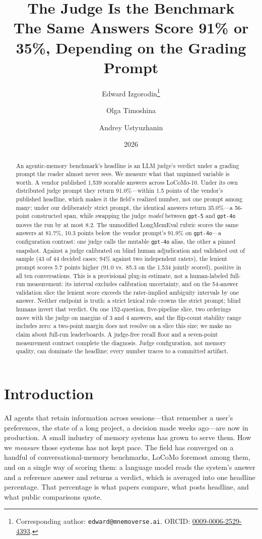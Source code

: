 \documentclass[11pt]{article}
\title{\textbf{The Judge Is the Benchmark}\\[2pt]
\large The Same Answers Score 91\% or 35\%, Depending on the Grading Prompt}
\author[1,2]{Edward Izgorodin\thanks{Corresponding author: \texttt{edward@mnemoverse.ai}.
  ORCID: \href{https://orcid.org/0009-0006-2529-4393}{0009-0006-2529-4393}.}}
\author[1]{Olga Timoshina}
\author[2,3,4]{Andrey Ustyuzhanin}
\affil[1]{Mnemoverse.AI,\ Funchal, Madeira, Portugal\thanks{\url{https://mnemoverse.com}}}
\affil[2]{Constructor Labs, Bremen, Germany}
\affil[3]{Constructor University, Bremen, Germany}
\affil[4]{Institute for Functional Intelligent Materials, National University of Singapore, Singapore}
\date{2026}
\begin{document}
\maketitle

\begin{abstract}
An agentic-memory benchmark's headline is an LLM judge's verdict under a grading prompt the reader almost never sees. We measure what that unpinned variable is worth. A vendor published 1{,}539 scorable answers across LoCoMo-10. Under its own distributed judge prompt they return 91.0\%---within 1.5 points of the vendor's published headline, which makes it the field's realized number, not one prompt among many; under our deliberately strict prompt, the identical answers return 35.0\%---a 56-point constructed span, while swapping the judge \emph{model} between \texttt{gpt-5} and \texttt{gpt-4o} moves the run by at most 8.2. The unmodified LongMemEval rubric scores the same answers at 81.7\%, 10.3 points below the vendor prompt's 91.9\% on \texttt{gpt-4o}---a configuration contrast: one judge calls the mutable \texttt{gpt-4o} alias, the other a pinned snapshot. Against a judge calibrated on blind human adjudication and validated out of sample (43 of 44 decided cases; 94\% against two independent raters), the lenient prompt scores 5.7 points higher (91.0 vs.\ 85.3 on the 1{,}534 jointly scored), positive in all ten conversations. This is a provisional plug-in estimate, not a human-labeled full-run measurement: its interval excludes calibration uncertainty, and on the 54-answer validation slice the lenient score exceeds the rater-implied ambiguity intervals by one answer. Neither endpoint is truth: a strict lexical rule crowns the strict prompt; blind humans invert that verdict. On one 152-question, five-pipeline slice, two orderings move with the judge on margins of 3 and 4 answers, and the flip-count stability range includes zero: a two-point margin does not resolve on a slice this size; we make no claim about full-run leaderboards. A judge-free recall floor and a seven-point measurement contract complete the diagnosis. Judge configuration, not memory quality, can dominate the headline; every number traces to a committed artifact.
\end{abstract}

\section{Introduction}\label{sec:intro}

AI agents that retain information across sessions---that remember a user's preferences, the state of a long project, a decision made weeks ago---are now in production. A small industry of memory systems has grown to serve them. How we \emph{measure} those systems has not kept pace. The field has converged on a handful of conversational-memory benchmarks, LoCoMo foremost among them, and on a single way of scoring them: a language model reads the system's answer and a reference answer and returns a verdict, which is averaged into one headline percentage. That percentage is what papers compare, what posts headline, and what public comparisons quote.
\end{document}
